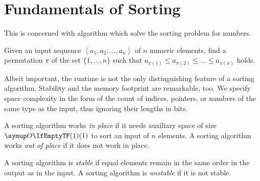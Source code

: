 \section{Fundamentals of Sorting}
\label{sec:prereq:sorting}

This  is concerned with algorithm which solve the sorting problem for numbers.
\begin{problem}[Sorting]
	Given an input sequence \(\left\langle a_1, a_2, \dots, a_n \right\rangle\) of \(n\) numeric elements, find a permutation \(\pi\) of the set \(\{ 1, \dots, n \}\) such that \(a_{\pi(1)} \le a_{\pi(2)} \le \dots \le a_{\pi(n)}\) holds.
\end{problem}
Albeit important, the runtime is not the only distinguishing feature of a sorting algorithm.
Stability and the memory footprint are remarkable, too.
We specify space complexity in the form of the count of indices, pointers, or numbers of the same type as the input, thus ignoring their lengths in bits.
\begin{definition}
	A sorting algorithm works \emph{in place} if it needs auxiliary space of size \(\bigoh{1}\) to sort an input of \(n\) elements.
	A sorting algorithm works \emph{out of place} if it does not work in place.
\end{definition}
\begin{definition}
	A sorting algorithm is \emph{stable} if equal elements remain in the same order in the output as in the input.
	A sorting algorithm is \emph{unstable} if it is not stable.
\end{definition}

